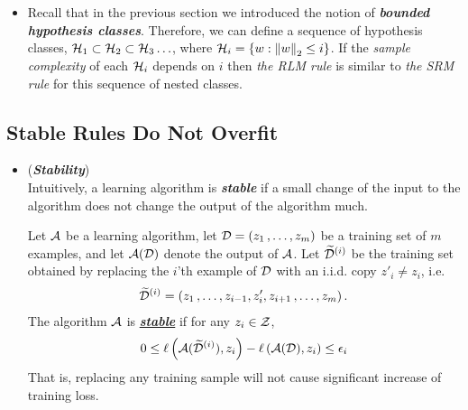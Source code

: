 \documentclass[11pt]{article}
\begin{document}
\begin{itemize}
\item \begin{remark}
Recall that in the previous section we introduced the notion of \emph{\textbf{bounded hypothesis classes}}. Therefore, we can define a sequence of hypothesis classes, ${\mathcal H}_1 \subset {\mathcal H}_2 \subset {\mathcal H}_3 \ldots$, where ${\mathcal H}_i = \left\{w : \left\|w\right\|_{2} \le i\right\}$. If the \emph{sample complexity} of each ${\mathcal H}_i$ depends on $i$ then \emph{the RLM rule} is similar to \emph{the SRM rule} for this sequence of nested classes.
\end{remark}
\end{itemize}
\subsection{Stable Rules Do Not Overfit}
\begin{itemize}
\item \begin{remark}(\textbf{\emph{Stability}})\\
Intuitively, a learning algorithm is \emph{\textbf{stable}} if a small change of the input to the algorithm does not change the output of the algorithm much.

Let ${\mathcal A}$ be a learning algorithm, let ${\mathcal D} = (z_1 \,{,}\ldots{,}\, z_m)$ be a training set of $m$ examples, and let ${\mathcal A}({\mathcal D})$ denote the output of ${\mathcal A}$. Let $\widetilde{{\mathcal D}}^{(i)}$ be the training set obtained by replacing the $i$'th example of ${\mathcal D}$ with an i.i.d. copy $z'_i \neq z_i$, i.e.
\begin{align*}
\widetilde{{\mathcal D}}^{(i)} = \left(z_1 \,{,}\ldots{,}\, z_{i-1},z_{i}', z_{i+1} \,{,}\ldots{,}\, z_m\right).
\end{align*} The algorithm ${\mathcal A}$ is \underline{\emph{\textbf{stable}}} if for any $z_i \in {\mathcal Z}$,
\begin{align}
0 \le \ell\left({\mathcal A}(\widetilde{{\mathcal D}}^{(i)}), z_i\right) - \ell\left({\mathcal A}({\mathcal D}), z_i\right) \le \epsilon_i  \label{def: stable_alg}
\end{align} That is, replacing any training sample will not cause significant increase of training loss.
\end{remark}


\end{itemize}
\end{document}
